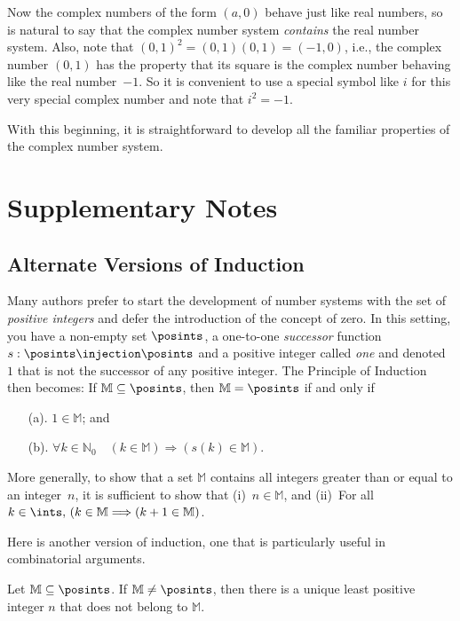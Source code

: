Now the complex numbers of the form $(a,0)$ behave just like
real numbers, so is natural to say that the complex number system
\textit{contains} the real number system.  Also, note that
$(0,1)^2=(0,1)(0,1)=(-1,0)$, i.e., the complex number $(0,1)$ has the
property that its square is the complex number behaving like the
real number~$-1$.  So it is convenient to use a special symbol like
$i$ for this very special complex number and note that $i^2=-1$.

With this beginning, it is straightforward to develop all the
familiar properties of the complex number system.

\section{Supplementary Notes}

\subsection{Alternate Versions of Induction}

Many authors prefer to start the development of number systems
with the set of \textit{positive integers} and defer the
introduction of the concept of zero.  In this setting,
you have a non-empty set $\posints$, a one-to-one 
\textit{successor} function $s:\posints\injection\posints$ and
a positive integer called \textit{one} and denoted~$1$ that
is not the successor of any positive integer.  The Principle of
Induction then becomes:  If $\mathbb{M}\subseteq\posints$, 
then $\mathbb{M} =\posints$ if and only if
\begin{enumerate}
\item[(a).] $1\in \mathbb{M}$; and 
\item[(b).] $\forall k\in \mathbb{N}_0\quad(k\in \mathbb{M}) 
  \Longrightarrow(s(k)\in \mathbb{M})$. 
\end{enumerate}

More generally, to show that a set $\mathbb{M}$ contains
all integers greater than or equal to an integer~$n$, it is
sufficient to show that (i)~$n\in\mathbb{M}$, and (ii)~For
all $k\in\ints,\,(k\in\mathbb{M}\Longrightarrow(k+1\in\mathbb{M})$.

Here is another version of induction, one that is particularly useful
in combinatorial arguments.

\begin{theorem}
Let $\mathbb{M}\subseteq\posints$.  If $\mathbb{M}\neq\posints$,
then there is a unique least positive integer $n$ that does not
belong to $\mathbb{M}$.
\end{theorem}


